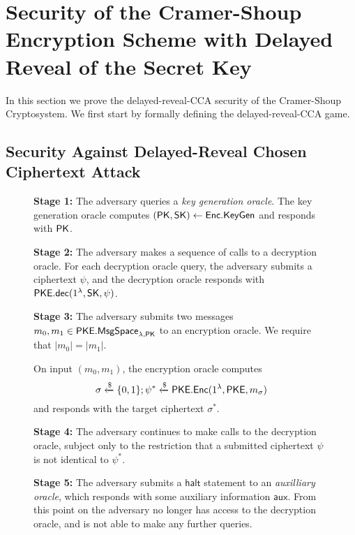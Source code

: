 \section{Security of the Cramer-Shoup Encryption Scheme with Delayed Reveal of the Secret Key}
\label{appendix-a}

In this section we prove the delayed-reveal-CCA security of the Cramer-Shoup Cryptosystem. We first start by formally defining the delayed-reveal-CCA game.

\subsection{Security Against Delayed-Reveal Chosen Ciphertext Attack}

\begin{figure}[ht!]
	\begin{framed}\small
		\textbf{Stage 1:} The adversary queries a \textit{key generation oracle}. The key generation oracle computes $(\mathsf{PK},\mathsf{SK})\leftarrow\mathsf{Enc}.\mathsf{KeyGen}$ and responds with $\mathsf{PK}$.
		
		\vspace{2mm}
		
		\textbf{Stage 2:} The adversary makes a sequence of calls to a decryption oracle. For each  decryption oracle query, the adversary submits a ciphertext $\psi$, and the decryption
		oracle responds with $\mathsf{PKE}.\mathsf{dec}(1^\lambda, \mathsf{SK},\psi)$.
		
		\vspace{2mm}
		
		\textbf{Stage 3:} The adversary submits two messages $m_0, m_1\in\mathsf{PKE}.\mathsf{MsgSpace}_{\lambda,\mathsf{PK}}$ to an encryption oracle. We require that $|m_0| = |m_1|$.
		
		On input $(m_0, m_1)$, the encryption oracle computes $$\sigma\xleftarrow{\$}\{0,1\};\psi^{*}\xleftarrow{\$}\mathsf{PKE}.\mathsf{Enc}(1^\lambda,\mathsf{PKE},m_\sigma)$$ and responds with the target ciphertext $\sigma^{*}$.
		
		\vspace{2mm}
		
		\textbf{Stage 4:} The adversary continues to make calls to the decryption oracle, subject only to the restriction that a submitted ciphertext $\psi$ is not identical to $\psi^{*}$.
		
		\vspace{2mm}
		
		\textbf{Stage 5:} The adversary submits a $\mathsf{halt}$ statement to an \textit{auxilliary oracle}, which responds with some auxiliary information $\mathsf{aux}$. From this point on the adversary no longer has access to the decryption oracle, and is not able to make any further queries.
		

\end{framed}
\end{figure}
